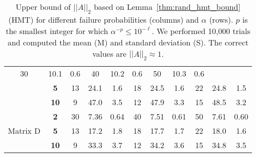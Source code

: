 \begin{table}
\begin{center}
\begin{tabular}{cc|c|c|c|c|c|c|c|c|c|}
    30 & 10.1 & 0.6 & 40 & 10.2 & 0.6 & 50 & 10.3 & 0.6 \\
\cline{2-11}
\multicolumn{1}{|c|}{} & \textbf{5} &
    13 & 24.1  & 1.6  & 18 & 24.5  & 1.6  & 22 & 24.8  & 1.5 \\
\cline{2-11}
\multicolumn{1}{|c|}{} & \textbf{10} &
    9 & 47.0 & 3.5   & 12 & 47.9  & 3.3  & 15 & 48.5 & 3.2 \\
\hline
\hline
\multicolumn{1}{|c|}{\multirow{3}{*}{Matrix D}} & \textbf{2} &
    30 & 7.36 & 0.64 & 40 & 7.51 & 0.61 & 50 & 7.61 & 0.60 \\
\cline{2-11}
\multicolumn{1}{|c|}{} & \textbf{5} &
    13 & 17.2  & 1.8  & 18 & 17.7  & 1.7  & 22 & 18.0  & 1.6 \\
\cline{2-11}
\multicolumn{1}{|c|}{} & \textbf{10} &
    9 & 33.3 & 3.7   & 12 & 34.2  & 3.6  & 15 & 34.8 & 3.5 \\
\hline
\end{tabular}
\end{center}
\caption[HMT 2-Norm Upper Bounds]{
Upper bound of $||A||_{2}$ based on
 Lemma~\ref{thm:rand_hmt_bound} (HMT) for different
failure probabilities (columns) and $\alpha$ (rows).
$p$ is the smallest integer for which $\alpha^{-p}\le 10^{-\ell}$.
We performed 10,000 trials and computed the mean (M) and standard deviation
(S). The correct values are $||A||_{2}\approx1$.
}
\label{tab:hmt_norm_ubound_mat}
\end{table}
